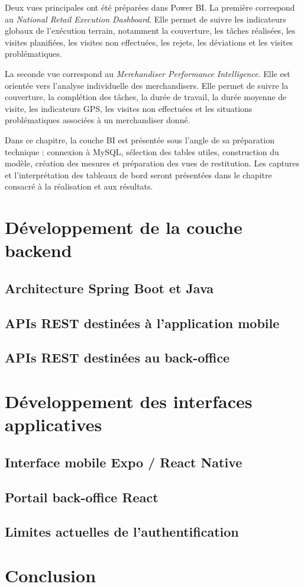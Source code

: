 Deux vues principales ont été préparées dans Power BI. La première correspond au \textit{National Retail Execution Dashboard}. Elle permet de suivre les indicateurs globaux de l’exécution terrain, notamment la couverture, les tâches réalisées, les visites planifiées, les visites non effectuées, les rejets, les déviations et les visites problématiques.

La seconde vue correspond au \textit{Merchandiser Performance Intelligence}. Elle est orientée vers l’analyse individuelle des merchandisers. Elle permet de suivre la couverture, la complétion des tâches, la durée de travail, la durée moyenne de visite, les indicateurs GPS, les visites non effectuées et les situations problématiques associées à un merchandiser donné.

Dans ce chapitre, la couche BI est présentée sous l’angle de sa préparation technique : connexion à MySQL, sélection des tables utiles, construction du modèle, création des mesures et préparation des vues de restitution. Les captures et l’interprétation des tableaux de bord seront présentées dans le chapitre consacré à la réalisation et aux résultats.

\section{Développement de la couche backend}

\subsection{Architecture Spring Boot et Java}
\subsection{APIs REST destinées à l’application mobile}
\subsection{APIs REST destinées au back-office}

\section{Développement des interfaces applicatives}

\subsection{Interface mobile Expo / React Native}
\subsection{Portail back-office React}
\subsection{Limites actuelles de l’authentification}

\section{Conclusion}
